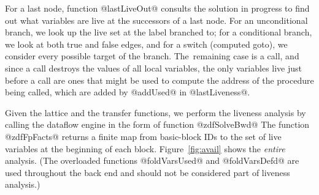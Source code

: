 \documentclass[blockstyle,preprint,nocopyrightspace]{sigplanconf}
\newcommand{\authornote}[1]{{\em #1}}
\def\authornote#1{\unskip\relax}
\newcommand{\simon}[1]{\authornote{SLPJ: #1}}
\newcommand\figref[1]{Figure~\ref{fig:#1}}
\begin{document}
For a last node, function @lastLiveOut@ consults the solution in
progress to find out what variables are live at the successors of a
last node. 
For an unconditional branch, we look up the live set at the label
branched to;
for a conditional branch, we look at both true and false edges, and
for a switch (computed goto), we consider every possible target of the
branch.
The~remaining case is a call, 
and since a call destroys the values of all local variables, the
only variables live just before a call are ones that might be used to
compute the address of the procedure being called, which are added by
@addUsed@ in @lastLiveness@.

Given the lattice and the transfer functions,
we perform the liveness analysis by calling
the dataflow engine in the form of function @zdfSolveBwd@
The function @zdfFpFacts@ returns 
a finite map from basic-block IDs to the set of live variables
at the beginning of each block.
\figref{avail} shows the \emph{entire} analysis.
(The overloaded functions
@foldVarsUsed@ and @foldVarsDefd@ are used throughout the back end and
should not be considered part of liveness analysis.)
\simon{Please let us give their types somewhere!  Every function
 should have either a type signature, or a type and an implementation. Otherwise
the code becomes opaque.  \textbf{NR}: Where do you suggest we put the types?
\textbf{SLPJ} I don't think it matters much.  Perhpas in a Figure
that collects the signatures of otherwise less-important functions, or in Figure
3 itself (but it's so wide it wastes space to put a type sig in!}
\end{document}
